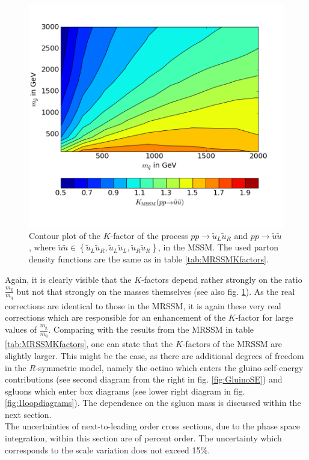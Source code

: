 \begin{figure}[H]
\begin{center}
\includegraphics[scale=.6]{figures/Kfactor_MSSM.png}
\caption{Contour plot of the $K$-factor of the process  $pp \to \tilde{u}_L\tilde{u}_R$ and $pp \to \tilde{u}\tilde{u}$, where \mbox{$\tilde{u}\tilde{u} \in \left\{ \tilde{u}_L\tilde{u}_R, \tilde{u}_L\tilde{u}_L, \tilde{u}_R\tilde{u}_R \right\}$,} in the MSSM. The used parton density functions are the same as in table \ref{tab:MRSSMKfactors}.}\label{fig:Kfactor_MSSM}
\end{center}
\end{figure}
Again, it is clearly visible that the $K$-factors depend rather strongly on the ratio $\frac{m_{\mathrm{g}}}{m_{\mathrm{q}}}$ but not that strongly on the masses themselves (see also fig. \ref{fig:Kfactor_MSSM}). As the real corrections are identical to those in the MRSSM, it is again these very real corrections which are responsible for an enhancement of the $K$-factor for large values of  $\frac{m_{\mathrm{g}}}{m_{\mathrm{q}}}$.
Comparing with the results from the MRSSM in table \ref{tab:MRSSMKfactors}, one can state that the $K$-factors of the MRSSM are slightly larger. This might be the case, as there are additional degrees of freedom in the $R$-symmetric model, namely the octino which enters the gluino self-energy contributions (see second diagram from the right in fig. \ref{fig:GluinoSE}) and sgluons which enter box diagrams (see lower right diagram in fig. \ref{fig:1loopdiagrams}). The dependence on the sgluon mass is discussed within the next section.\\
The uncertainties of next-to-leading order cross sections, due to the phase space integration, within this section are of percent order. The uncertainty which corresponds to the scale variation does not exceed 15\%.



